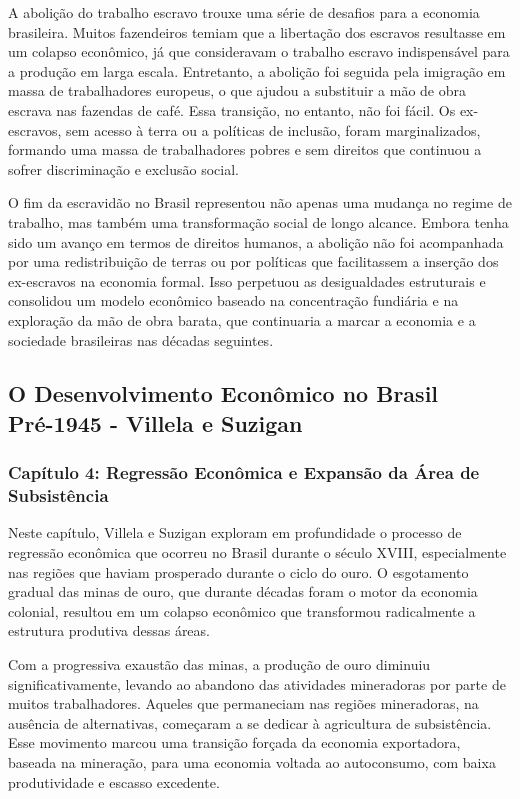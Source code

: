 \documentclass[a4paper,12pt]{article}[abntex2]
\begin{document}
A abolição do trabalho escravo trouxe uma série de desafios para a economia brasileira. Muitos fazendeiros temiam que a libertação dos escravos resultasse em um colapso econômico, já que consideravam o trabalho escravo indispensável para a produção em larga escala. Entretanto, a abolição foi seguida pela imigração em massa de trabalhadores europeus, o que ajudou a substituir a mão de obra escrava nas fazendas de café. Essa transição, no entanto, não foi fácil. Os ex-escravos, sem acesso à terra ou a políticas de inclusão, foram marginalizados, formando uma massa de trabalhadores pobres e sem direitos que continuou a sofrer discriminação e exclusão social.

O fim da escravidão no Brasil representou não apenas uma mudança no regime de trabalho, mas também uma transformação social de longo alcance. Embora tenha sido um avanço em termos de direitos humanos, a abolição não foi acompanhada por uma redistribuição de terras ou por políticas que facilitassem a inserção dos ex-escravos na economia formal. Isso perpetuou as desigualdades estruturais e consolidou um modelo econômico baseado na concentração fundiária e na exploração da mão de obra barata, que continuaria a marcar a economia e a sociedade brasileiras nas décadas seguintes.

\newpage
\subsection{\textbf{O Desenvolvimento Econômico no Brasil Pré-1945 - Villela e Suzigan}}

\subsubsection{\textbf{Capítulo 4: Regressão Econômica e Expansão da Área de Subsistência}}

Neste capítulo, Villela e Suzigan exploram em profundidade o processo de regressão econômica que ocorreu no Brasil durante o século XVIII, especialmente nas regiões que haviam prosperado durante o ciclo do ouro. O esgotamento gradual das minas de ouro, que durante décadas foram o motor da economia colonial, resultou em um colapso econômico que transformou radicalmente a estrutura produtiva dessas áreas.

Com a progressiva exaustão das minas, a produção de ouro diminuiu significativamente, levando ao abandono das atividades mineradoras por parte de muitos trabalhadores. Aqueles que permaneciam nas regiões mineradoras, na ausência de alternativas, começaram a se dedicar à agricultura de subsistência. Esse movimento marcou uma transição forçada da economia exportadora, baseada na mineração, para uma economia voltada ao autoconsumo, com baixa produtividade e escasso excedente.
\end{document}
